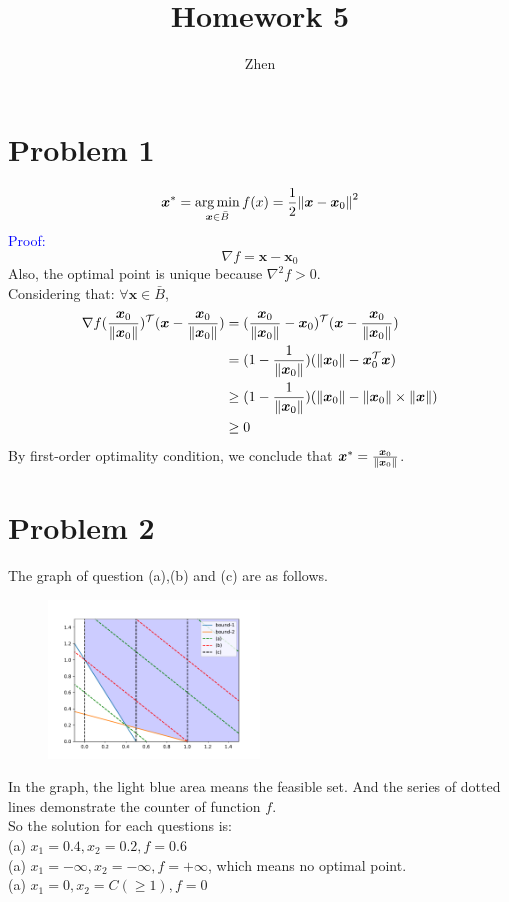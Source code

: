 \documentclass{article}
\def\bx{\boldsymbol{x}}
\def\Eproof{\textcolor{blue}{Proof: }}
\begin{document}
\title{Homework 5}
\author{Zhen}
\maketitle

\section*{Problem 1}
$$
\bx^*=\mathop{\arg\min}_{\bx\in\bar{B}}f(x)=\frac{1}{2}\norm{\bx-\bx_0}^2
$$
\Eproof
$$
\nabla f=\bx-\bx_0
$$
Also, the optimal point is unique because $\nabla^2f>0$.
\\
Considering that: $\forall\bx\in\bar{B}$,
$$
\begin{aligned}
	\nabla f(\frac{\bx_0}{\norm{\bx_0}})^{\mathcal{T}}
	(\bx-\frac{\bx_0}{\norm{\bx_0}})
	&=
	(\frac{\bx_0}{\norm{\bx_0}}-\bx_0)^{\mathcal{T}}
	(\bx-\frac{\bx_0}{\norm{\bx_0}})
	\\
	&=
	(1-\frac{1}{\norm{\bx_0}})
	(\norm{\bx_0}-\bx_0^{\mathcal{T}}\bx)
	\\
	&\ge
	(1-\frac{1}{\norm{\bx_0}})
	(\norm{\bx_0}-\norm{\bx_0}\times\norm{\bx})
	\\
	&\ge
	0
\end{aligned}
$$
By first-order optimality condition, we conclude that $\bx^*=\frac{\bx_0}{\norm{\bx_0}}$.
\section*{Problem 2}
The graph of question (a),(b) and (c) are as follows.
\begin{figure}[h]
	\centering
	\includegraphics[width=0.5\textwidth]{P2.pdf}
\end{figure}

In the graph, the light blue area means the feasible set. And the series of dotted lines demonstrate the counter of function $f$.
\\
So the solution for each questions is:\\
(a) $x_1=0.4,x_2=0.2,f=0.6$\\
(a) $x_1=-\infty,x_2=-\infty,f=+\infty$, which means no optimal point.\\
(a) $x_1=0,x_2=C(\ge1),f=0$
\end{document}
